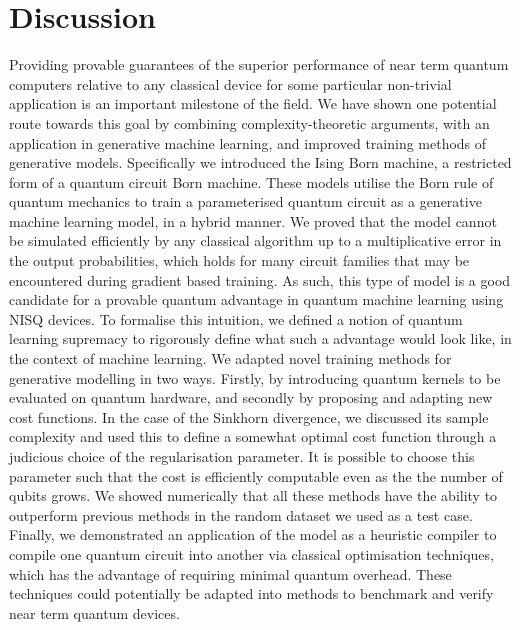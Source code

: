 \section*{Discussion}\label{sec:discussion}
Providing provable guarantees of the superior performance of near term quantum computers relative to any classical device for some particular non-trivial application is an important milestone of the field. We have shown one potential route towards this goal by combining complexity-theoretic arguments\cite{bremner_classical_2011, aaronson_computational_2013, boixo_characterizing_2018}, with an application in generative machine learning\cite{gao_efficient_2017, benedetti_generative_2019, liu_differentiable_2018, du_expressive_2018}, and improved training methods of generative models. Specifically we introduced the Ising Born machine, a restricted form of a quantum circuit Born machine. These models utilise the Born rule of quantum mechanics to train a parameterised quantum circuit as a generative machine learning model, in a hybrid manner.
We proved that the model cannot be simulated efficiently by any classical algorithm up to a multiplicative error in the output probabilities, which holds for many circuit families that may be encountered during gradient based training. As such, this type of model is a good candidate for a provable quantum advantage in quantum machine learning using NISQ devices. To formalise this intuition, we defined a notion of quantum learning supremacy to rigorously define what such a advantage would look like, in the context of machine learning.
We adapted novel training methods for generative modelling in two ways. Firstly, by introducing quantum kernels to be evaluated on quantum hardware, and secondly by proposing and adapting new cost functions. In the case of the Sinkhorn divergence, we discussed its sample complexity and used this to define a somewhat optimal cost function through a judicious choice of the regularisation parameter. It is possible to choose this parameter such that the cost is efficiently computable even as the the number of qubits grows. We showed numerically that all these methods have the ability to outperform previous methods in the random dataset we used as a test case. Finally, we demonstrated an application of the model as a heuristic compiler to compile one quantum circuit into another via classical optimisation techniques, which has the advantage of requiring minimal quantum overhead. These techniques could potentially be adapted into methods to benchmark and verify near term quantum devices.
